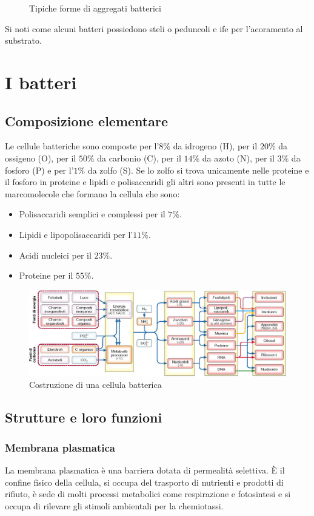 \begin{multicols}{2}
\begin{figure}[H]
\caption{Tipiche forme di aggregati batterici}
\end{figure}
Si noti come alcuni batteri possiedono steli o peduncoli e ife per l'acoramento al substrato.
\end{multicols}
\section{I batteri}

\subsection{Composizione elementare}
Le cellule batteriche sono composte per l'$8\%$ da idrogeno (H), per il $20\%$ da ossigeno (O), per il $50\%$ da carbonio (C), per il $14\%$ da azoto (N), 
per il $3\%$ da fosforo (P) e per l'$1\%$ da zolfo (S). Se lo zolfo si trova unicamente nelle proteine e il fosforo in proteine e lipidi e polisaccaridi gli
altri sono presenti in tutte le marcomolecole che formano la cellula che sono:
\begin{itemize}
\item Polisaccaridi semplici e complessi per il $7\%$.
\item Lipidi e lipopolisaccaridi per l'$11\%$. 
\item Acidi nucleici per il $23\%$.
\item Proteine per il $55\%$.
\end{itemize}
\begin{figure}[H]
\includegraphics[scale = 0.3]{Pictures/CosCellulaBat.png}
\caption{Costruzione di una cellula batterica}
\end{figure}
\subsection{Strutture e loro funzioni}
\subsubsection{Membrana plasmatica}
La membrana plasmatica \`e una barriera dotata di permealit\`a selettiva. \`E il confine fisico della cellula, si occupa del trasporto di nutrienti e 
prodotti di rifiuto, \`e sede di molti processi metabolici come respirazione e fotosintesi e si occupa di rilevare gli stimoli ambientali per la 
chemiotassi.
